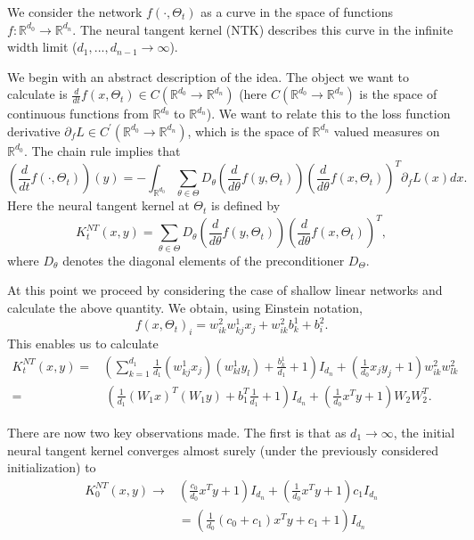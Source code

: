 We consider the network $f(\cdot, \Theta_t)$ as a curve in the space of functions $f:\mathbb{R}^{d_0}\rightarrow \mathbb{R}^{d_n}$. The neural tangent kernel (NTK) describes this curve in the infinite width limit ($d_1,...,d_{n-1}\rightarrow \infty$). 

We begin with an abstract description of the idea. The object we want to calculate is $\frac{d}{dt}f(x,\Theta_t)\in C(\mathbb{R}^{d_0}\rightarrow \mathbb{R}^{d_n})$ (here $C(\mathbb{R}^{d_0}\rightarrow \mathbb{R}^{d_n})$ is the space of continuous functions from $\mathbb{R}^{d_0}$ to $\mathbb{R}^{d_n}$). We want to relate this to the loss function derivative $\partial_fL\in C^\prime(\mathbb{R}^{d_0}\rightarrow \mathbb{R}^{d_n})$, which is the space of $\mathbb{R}^{d_n}$ valued measures on $\mathbb{R}^{d_0}$. The chain rule implies that
\begin{equation}
 \left(\frac{d}{dt}f(\cdot,\Theta_t)\right)(y) = -\int_{\mathbb{R}^{d_0}} \sum_{\theta\in \Theta}D_\theta \left(\frac{d}{d\theta} f(y, \Theta_t)\right)
 \left(\frac{d}{d\theta} f(x, \Theta_t)\right)^T \partial_fL(x) dx.
\end{equation}
Here the neural tangent kernel at $\Theta_t$ is defined by
\begin{equation}
 K^{NT}_t(x,y) = \sum_{\theta\in \Theta} D_\theta\left(\frac{d}{d\theta} f(y, \Theta_t)\right)
 \left(\frac{d}{d\theta} f(x, \Theta_t)\right)^T,
\end{equation}
where $D_\theta$ denotes the diagonal elements of the preconditioner $D_\Theta$.

At this point we proceed by considering the case of shallow linear networks and calculate the above quantity. We obtain, using Einstein notation,
\begin{equation}
 f(x, \Theta_t)_i = w^2_{ik}w^1_{kj}x_j + w^2_{ik}b^1_k + b^2_i.
\end{equation}
This enables us to calculate
\begin{equation}
\begin{split}
 K^{NT}_t(x,y) = &\left(\sum_{k=1}^{d_1} \frac{1}{d_1}(w^1_{kj}x_j)(w^1_{kl}y_l) + \frac{b^1_k}{d_1} + 1\right)I_{d_n} + \left(\frac{1}{d_0}x_jy_j + 1\right) w^2_{ik}w^2_{lk} \\
 = &~\left(\frac{1}{d_1}(W_1x)^T(W_1y) + b_1^T\frac{1}{d_1} + 1\right)I_{d_n} + \left(\frac{1}{d_0}x^Ty + 1\right) W_2W_2^T.
 \end{split}
\end{equation}

There are now two key observations made. The first is that as $d_1\rightarrow \infty$, the initial neural tangent kernel converges almost surely (under the previously considered initialization) to
\begin{equation}
\begin{split}
 K^{NT}_0(x,y) \rightarrow &\left(\frac{c_0}{d_0}x^Ty + 1\right)I_{d_n} + \left(\frac{1}{d_0}x^Ty + 1\right) c_1I_{d_n} \\
 &= \left(\frac{1}{d_0}\left(c_0 + c_1\right)x^Ty + c_1 + 1\right)I_{d_n}
 \end{split}
\end{equation}

